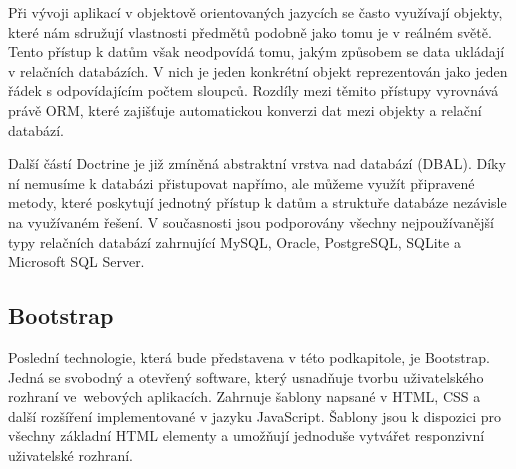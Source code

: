 Při vývoji aplikací v objektově orientovaných jazycích se často využívají objekty, které nám sdružují vlastnosti předmětů podobně jako tomu je v reálném světě. Tento přístup k datům však neodpovídá tomu, jakým způsobem se data ukládají v relačních databázích. V nich je jeden konkrétní objekt reprezentován jako jeden řádek s odpovídajícím počtem sloupců. Rozdíly mezi těmito přístupy vyrovnává právě ORM, které zajišťuje automatickou konverzi dat mezi objekty a relační databází. \cite{doctrine_orm}

Další částí Doctrine je již zmíněná abstraktní vrstva nad databází (DBAL). Díky ní nemusíme k databázi přistupovat napřímo, ale můžeme využít připravené metody, které poskytují jednotný přístup k datům a struktuře databáze nezávisle na využívaném řešení. V současnosti jsou podporovány všechny nejpoužívanější typy relačních databází zahrnující MySQL, Oracle, PostgreSQL, SQLite a Microsoft SQL Server. \cite{doctrine_dbal}

\subsection{Bootstrap}\label{bootstrap}
Poslední technologie, která bude představena v této podkapitole, je Bootstrap. Jedná se svobodný a otevřený software, který usnadňuje tvorbu uživatelského rozhraní ve~webových aplikacích. Zahrnuje šablony napsané v HTML, CSS a další rozšíření implementované v jazyku JavaScript. Šablony jsou k dispozici pro všechny základní HTML elementy a umožňují jednoduše vytvářet responzivní uživatelské rozhraní. \cite{bootstrap}
